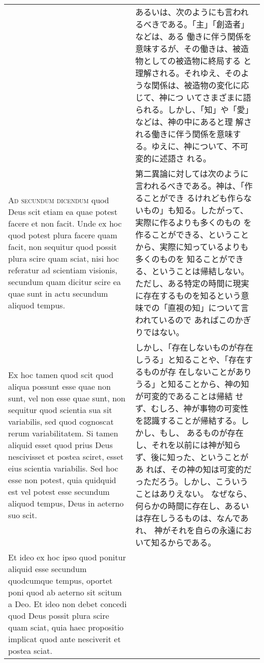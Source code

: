 \documentclass[10pt]{jsarticle} %
\begin{document}
\begin{longtable}{p{21em}p{21em}}
&

あるいは、次のようにも言われるべきである。「主」「創造者」などは、ある
働きに伴う関係を意味するが、その働きは、被造物としての被造物に終局する
と理解される。それゆえ、そのような関係は、被造物の変化に応じて、神につ
いてさまざまに語られる。しかし、「知」や「愛」などは、神の中にあると理
解される働きに伴う関係を意味する。ゆえに、神について、不可変的に述語さ
れる。



\\


{\scshape Ad secundum dicendum} quod Deus scit etiam ea
quae potest facere et non facit. Unde ex hoc quod potest plura facere
quam facit, non sequitur quod possit plura scire quam sciat, nisi hoc
referatur ad scientiam visionis, secundum quam dicitur scire ea quae
sunt in actu secundum aliquod tempus. 


&

第二異論に対しては次のように言われるべきである。神は、「作ることができ
るけれども作らないもの」も知る。したがって、実際に作るよりも多くのもの
を作ることができる、ということから、実際に知っているよりも多くのものを
知ることができる、ということは帰結しない。ただし、ある特定の時間に現実
に存在するものを知るという意味での「直視の知」について言われているので
あればこのかぎりではない。

\\


Ex hoc tamen quod scit quod aliqua
possunt esse quae non sunt, vel non esse quae sunt, non sequitur quod
scientia sua sit variabilis, sed quod cognoscat rerum variabilitatem. Si
tamen aliquid esset quod prius Deus nescivisset et postea sciret, esset
eius scientia variabilis. Sed hoc esse non potest, quia quidquid est vel
potest esse secundum aliquod tempus, Deus in aeterno suo scit. 


&

しかし、「存在しないものが存在しうる」と知ることや、「存在するものが存
在しないことがありうる」と知ることから、神の知が可変的であることは帰結
せず、むしろ、神が事物の可変性を認識することが帰結する。しかし、もし、
あるものが存在し、それを以前には神が知らず、後に知った、ということがあ
れば、その神の知は可変的だっただろう。しかし、こういうことはありえない。
なぜなら、何らかの時間に存在し、あるいは存在しうるものは、なんであれ、
神がそれを自らの永遠において知るからである。

\\


Et ideo
ex hoc ipso quod ponitur aliquid esse secundum quodcumque tempus,
oportet poni quod ab aeterno sit scitum a Deo. Et ideo non debet concedi
quod Deus possit plura scire quam sciat, quia haec propositio implicat
quod ante nesciverit et postea sciat.


\end{longtable}
\end{document}
